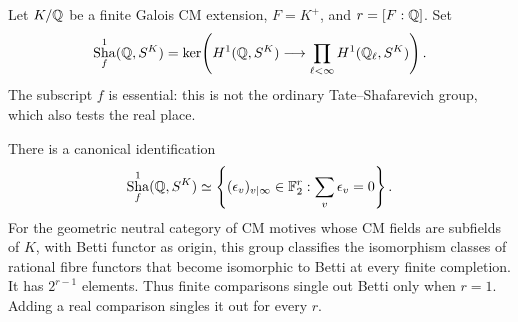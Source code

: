 Let $K/\mathbb Q$ be a finite Galois CM extension, $F=K^+$, and
$r=[F:\mathbb Q]$.  Set
\[
 \mathop{\mathrm{Sha}}^1_f(\mathbb Q,S^K)=
 \ker\!\left(H^1(\mathbb Q,S^K)\longrightarrow
                      \prod_{\ell<\infty}H^1(\mathbb Q_\ell,S^K)\right).
\]
The subscript $f$ is essential: this is not the ordinary
Tate--Shafarevich group, which also tests the real place.

\begin{theorem}
\label{thm:d-serre-finite-kernel}
There is a canonical identification
\[
 \mathop{\mathrm{Sha}}^1_f(\mathbb Q,S^K)
 \simeq
 \left\{(\epsilon_v)_{v\mid\infty}\in\mathbb F_2^r:
                            \sum_v\epsilon_v=0\right\}.
\]
For the geometric neutral category of CM motives whose CM fields
are subfields of $K$, with Betti functor as origin, this group
classifies the isomorphism classes of rational fibre functors that
become isomorphic to Betti at every finite completion.  It has
$2^{r-1}$ elements.  Thus finite comparisons single out Betti only
when $r=1$.  Adding a real comparison singles it out for every $r$.
\end{theorem}

